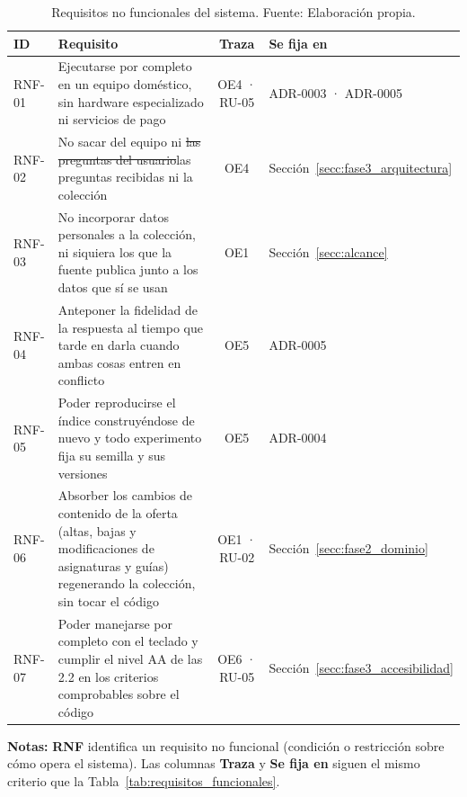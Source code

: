 \begin{table}[htbp]
  \centering
  \small
  \caption[Requisitos no funcionales del sistema]{Requisitos no funcionales del
    sistema. Fuente: Elaboración propia.}
  \label{tab:requisitos_no_funcionales}
  \begin{tabularx}{\textwidth}{@{}l >{\hsize}Y c >{\hsize}Y@{}}
    \toprule
    \textbf{ID} & \textbf{Requisito} & \textbf{Traza} & \textbf{Se fija en} \\
    \midrule
    RNF-01 & Ejecutarse por completo en un equipo doméstico, sin hardware especializado ni servicios de pago                                   & OE4 · RU-05 & ADR-0003 · ADR-0005 \\
    RNF-02 & No sacar del equipo ni \sout{las preguntas del usuario}\textcolor{borrador2}{las preguntas recibidas} ni la colección                                                                  & OE4         & Sección~\ref{secc:fase3_arquitectura} \\
    RNF-03 & No incorporar datos personales a la colección, ni siquiera los que la fuente publica junto a los datos que sí se usan             & OE1         & Sección~\ref{secc:alcance} \\
    RNF-04 & Anteponer la fidelidad de la respuesta al tiempo que tarde en darla cuando ambas cosas entren en conflicto                        & OE5         & ADR-0005 \\
    RNF-05 & Poder reproducirse el índice construyéndose de nuevo y todo experimento fija su semilla y sus versiones                            & OE5         & ADR-0004 \\
    RNF-06 & Absorber los cambios de contenido de la oferta (altas, bajas y modificaciones de asignaturas y guías) regenerando la colección, sin tocar el código & OE1 · RU-02 & Sección~\ref{secc:fase2_dominio} \\
    RNF-07 & Poder manejarse por completo con el teclado y cumplir el nivel AA de las  2.2 en los criterios comprobables sobre el código & OE6 · RU-05 & Sección~\ref{secc:fase3_accesibilidad} \\
    \bottomrule
  \end{tabularx}
  \begin{minipage}{0.95\textwidth}
    \vspace{4pt}
    \tiny
    \textbf{Notas:} \textbf{RNF} identifica un requisito no funcional (condición o restricción sobre cómo opera el sistema). Las columnas \textbf{Traza} y \textbf{Se fija en} siguen el mismo criterio que la Tabla~\ref{tab:requisitos_funcionales}.
  \end{minipage}
\end{table}
